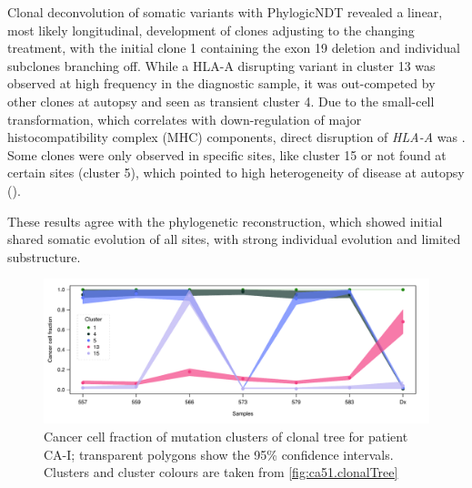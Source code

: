 Clonal deconvolution of somatic variants with PhylogicNDT revealed a linear, most likely longitudinal, development of clones adjusting to the changing treatment, with the initial clone 1 containing the exon 19 deletion and individual subclones branching off. While a HLA-A disrupting variant in cluster 13 was observed at high frequency in the diagnostic sample, it was out-competed by other clones at autopsy and seen as transient cluster 4. Due to the small-cell transformation, which correlates with  down-regulation of major histocompatibility complex (MHC) components,  direct disruption of \textit{HLA-A} was . Some clones  were only observed in specific sites, like cluster 15 or  not found at certain sites (cluster 5), which pointed to  high heterogeneity of disease at autopsy ().

These results agree with the phylogenetic reconstruction, which showed initial shared somatic evolution of all sites, with strong individual evolution and limited substructure.

\begin{figure}[htbp]
\centering
\includegraphics[width=.99\linewidth]{Figures/CASCADE/CA51/CA51.ccf_cluster.pdf}
\caption[Cancer cell fraction of mutation clusters of the clonal tree for patient CA-I]{Cancer cell fraction of mutation clusters of clonal tree for patient CA-I; transparent polygons show the 95\% confidence intervals. Clusters and cluster colours are taken from \protect\autoref{fig:ca51.clonalTree}} \label{fig:ca51.ccfCluster}
\end{figure}


\cleardoublepage



